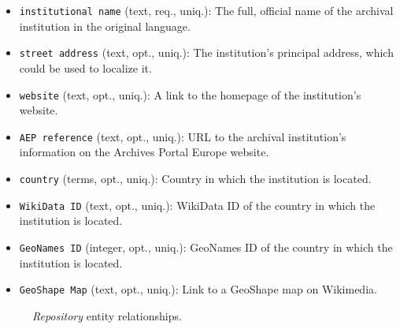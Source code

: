 \begin{itemize}
    \item \texttt{institutional name} (text, req., uniq.): The full, official name of the archival institution in the original language.
    \item \texttt{street address} (text, opt., uniq.): The institution's principal address, which could be used to localize it.
    \item \texttt{website} (text, opt., uniq.): A link to the homepage of the institution's website.
    \item \texttt{AEP reference}  (text, opt., uniq.): URL to the archival institution's information on the Archives Portal Europe website.
    \item \texttt{country} (terms, opt., uniq.): Country in which the institution is located.
    \item \texttt{WikiData ID} (text, opt., uniq.): WikiData ID of the country in which the institution is located.
    \item \texttt{GeoNames ID} (integer, opt., uniq.): GeoNames ID of the country in which the institution is located.
    \item \texttt{GeoShape Map} (text, opt., uniq.): Link to a GeoShape map on Wikimedia.
\end{itemize}

\begin{figure}[ht]
    \begin{center}
        
    \end{center}
\label{fig:RepositoryER}
\caption{\textit{Repository} entity relationships.}
\end{figure}


